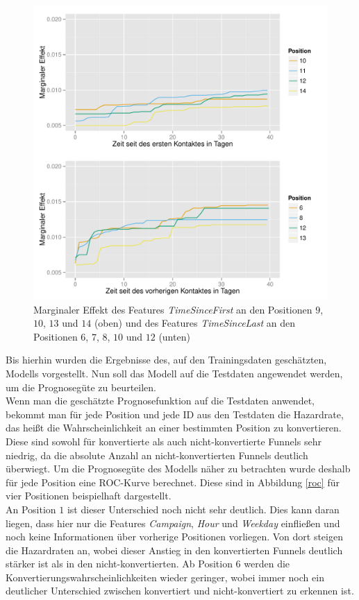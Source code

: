 \begin{figure}[H]
	\centering\includegraphics[scale=0.75]{marg_eff_time.pdf}\caption{Marginaler Effekt des Features \textit{TimeSinceFirst} an den Positionen $9$, $10$, $13$ und $14$ (oben) und des Features \textit{TimeSinceLast} an den Positionen $6$, $7$, $8$, $10$ und $12$ (unten)}\label{marg_eff_time}
\end{figure}
Bis hierhin wurden die Ergebnisse des, auf den Trainingsdaten geschätzten, Modells vorgestellt. Nun soll das Modell auf die Testdaten angewendet werden, um die Prognosegüte zu beurteilen.\\
Wenn man die geschätzte Prognosefunktion auf die Testdaten anwendet, bekommt man für jede Position und jede ID aus den Testdaten die Hazardrate, das heißt die Wahrscheinlichkeit an einer bestimmten Position zu konvertieren. Diese sind sowohl für konvertierte als auch nicht-konvertierte Funnels sehr niedrig, da die absolute Anzahl an nicht-konvertierten Funnels deutlich überwiegt. Um die Prognosegüte des Modells näher zu betrachten wurde deshalb für jede Position eine ROC-Kurve berechnet. Diese sind in Abbildung \ref{roc} für vier Positionen beispielhaft dargestellt.\\
An Position $1$ ist dieser Unterschied noch nicht sehr deutlich. Dies kann daran liegen, dass hier nur die Features \textit{Campaign}, \textit{Hour} und \textit{Weekday} einfließen und noch keine Informationen über vorherige Positionen vorliegen. Von dort steigen die Hazardraten an, wobei dieser Anstieg in den konvertierten Funnels deutlich stärker ist als in den nicht-konvertierten. Ab Position $6$ werden die Konvertierungswahrscheinlichkeiten wieder geringer, wobei immer noch ein deutlicher Unterschied zwischen konvertiert und nicht-konvertiert zu erkennen ist.\\
